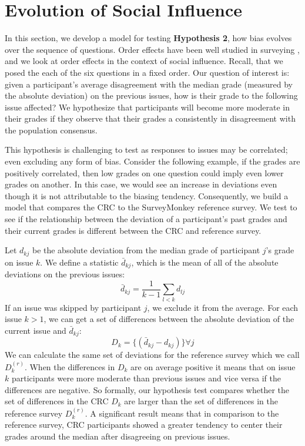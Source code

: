 \section{Evolution of Social Influence}
\label{path}
In this section, we develop a model for testing \textbf{Hypothesis 2}, how bias evolves over the sequence of questions.
Order effects have been well studied in surveying \cite{krosnick1987evaluation}, and we look at order effects in the context of social influence. 
Recall, that we posed the each of the six questions in a fixed order.
Our question of interest is: given a participant's average disagreement with the median grade (measured by the absolute deviation) on the previous issues, how is their grade to the following issue affected?
We hypothesize that participants will become more moderate in their grades if they observe that their grades a consistently in disagreement with the population consensus.

This hypothesis is challenging to test as responses to issues may be correlated; even excluding any form of bias.
Consider the following example, if the grades are positively correlated, then low grades on one question could imply even lower grades on another.
In this case, we would see an increase in deviations even though it is not attributable to the biasing tendency.
Consequently, we build a model that compares the CRC to the SurveyMonkey reference survey.
We test to see if the relationship between the deviation of a participant's past grades and their current grades is different between the CRC and reference survey.

Let $d_{kj}$ be the absolute deviation from the median grade of participant $j$'s grade on issue $k$. 
We define a statistic $\bar{d}_{kj}$, which is the mean of all of the absolute deviations on the previous issues:
\begin{equation}
\bar{d}_{kj} = \frac{1}{k-1} \sum_{l < k}  d_{lj}
\end{equation}
If an issue was skipped by participant $j$, we exclude it from the average.
For each issue $k > 1$, we can get a set of differences between the absolute deviation of the current issue and $\bar{d}_{kj}$:
\begin{equation}
D_k = \{(\bar{d}_{kj}-d_{kj})\} \forall j
\end{equation}
We can calculate the same set of deviations for the reference survey which we call $D_k^{(r)}$.
When the differences in $D_k$ are on average positive it means that on issue $k$ participants were more moderate than previous issues and vice versa if the differences are negative.
So formally, our hypothesis test compares whether the set of differences in the CRC $D_k$ are larger than the set of differences in the reference survey $D_k^{(r)}$.
A significant result means that in comparison to the reference survey, CRC participants showed a greater tendency to center their grades around the median after disagreeing on previous issues.

